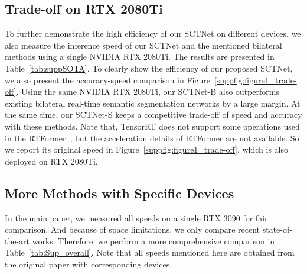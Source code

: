 \documentclass[letterpaper]{article} %
\begin{document}
\subsection{Trade-off on RTX 2080Ti}\label{app:rtx2080}
 To further demonstrate the high efficiency of our SCTNet on different devices, we also measure the inference speed of our SCTNet and the mentioned bilateral methods using a single NVIDIA RTX 2080Ti. The results are presented in Table~\ref{tab:suppSOTA}. 
 To clearly show the efficiency of our proposed SCTNet, we also present the accuracy-speed comparison in Figure~\ref{suppfig:figure1_trade-off}. Using the same NVIDIA RTX 2080Ti, our SCTNet-B also outperforms existing bilateral real-time semantic segmentation networks by a large margin. At the same time, our SCTNet-S keeps a competitive trade-off of speed and accuracy with these methods.
 Note that, TensorRT does not support some operations used in the RTFormer~\cite{wang2022rtformer}, but the acceleration details of RTFormer are not available. So we report its original speed in Figure~\ref{suppfig:figure1_trade-off}, which is also deployed on RTX 2080Ti. 





\subsection{More Methods with Specific Devices}
In the main paper, we measured all speeds on a single RTX 3090 for fair comparison. And because of space limitations, we only compare recent state-of-the-art works. Therefore, we perform a more comprehensive comparison in Table~\ref{tab:Sup_overall}. Note that all speeds mentioned here are obtained from the original paper with corresponding devices.
\end{document}
